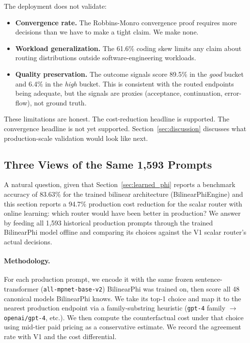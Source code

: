 The deployment does not validate:

\begin{itemize}
    \item \textbf{Convergence rate.} The Robbins-Monro convergence proof requires more decisions than we have to make a tight claim. We make none.
    \item \textbf{Workload generalization.} The 61.6\% coding skew limits any claim about routing distributions outside software-engineering workloads.
    \item \textbf{Quality preservation.} The outcome signals score 89.5\% in the \textit{good} bucket and 6.4\% in the \textit{high} bucket. This is consistent with the routed endpoints being adequate, but the signals are proxies (acceptance, continuation, error-flow), not ground truth.
\end{itemize}

These limitations are honest. The cost-reduction headline is supported. The convergence headline is not yet supported. Section~\ref{sec:discussion} discusses what production-scale validation would look like next.

\subsection{Three Views of the Same 1{,}593 Prompts}
\label{sec:three_views}

A natural question, given that Section~\ref{sec:learned_phi} reports a benchmark accuracy of 83.63\% for the trained bilinear architecture (BilinearPhiEngine) and this section reports a 94.7\% production cost reduction for the scalar router with online learning: which router would have been better in production? We answer by feeding all 1{,}593 historical production prompts through the trained BilinearPhi model offline and comparing its choices against the V1 scalar router's actual decisions.

\paragraph{Methodology.} For each production prompt, we encode it with the same frozen sentence-transformer (\texttt{all-mpnet-base-v2}) BilinearPhi was trained on, then score all 48 canonical models BilinearPhi knows. We take its top-1 choice and map it to the nearest production endpoint via a family-substring heuristic (\texttt{gpt-4} family $\to$ \texttt{openai/gpt-4}, etc.). We then compute the counterfactual cost under that choice using mid-tier paid pricing as a conservative estimate. We record the agreement rate with V1 and the cost differential.

